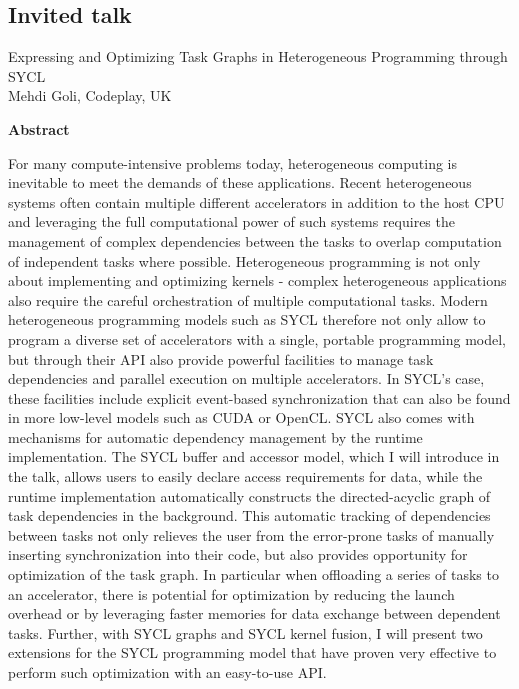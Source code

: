 \documentclass{article}
\begin{document}
\subsection{Invited talk}
Expressing and Optimizing Task Graphs in Heterogeneous Programming through SYCL\\  
Mehdi Goli, Codeplay, UK
    \begin{center}
        \textbf{Abstract}
    \end{center}
For many compute-intensive problems today, heterogeneous computing is inevitable to meet the demands of these applications. Recent heterogeneous systems often contain multiple different accelerators in addition to the host CPU and leveraging the full computational power of such systems requires the management of complex dependencies between the tasks to overlap computation of independent tasks where possible. Heterogeneous programming is not only about implementing and optimizing kernels - complex heterogeneous applications also require the careful orchestration of multiple computational tasks. Modern heterogeneous programming models such as SYCL therefore not only allow to program a diverse set of accelerators with a single, portable programming model, but through their API also provide powerful facilities to manage task dependencies and parallel execution on multiple accelerators. In SYCL’s case, these facilities include explicit event-based synchronization that can also be found in more low-level models such as CUDA or OpenCL. SYCL also comes with mechanisms for automatic dependency management by the runtime implementation. The SYCL buffer and accessor model, which I will introduce in the talk, allows users to easily declare access requirements for data, while the runtime implementation automatically constructs the directed-acyclic graph of task dependencies in the background. This automatic tracking of dependencies between tasks not only relieves the user from the error-prone tasks of manually inserting synchronization into their code, but also provides opportunity for optimization of the task graph. In particular when offloading a series of tasks to an accelerator, there is potential for optimization by reducing the launch overhead or by leveraging faster memories for data exchange between dependent tasks. Further, with SYCL graphs and SYCL kernel fusion, I will present two extensions for the SYCL programming model that have proven very effective to perform such optimization with an easy-to-use API.
\end{document}
